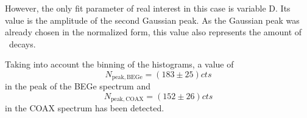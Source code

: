 \documentclass[encoding=utf8,british]{tumphthesis}
\begin{document}

However, the only fit parameter of real interest in this case is variable D.
Its value is the amplitude of the second Gaussian peak.
As the Gaussian peak was already chosen in the normalized form, this value also represents the amount of \Kr\ decays.

Taking into account the binning of the histograms, a value of  
\begin{equation*}
N_{\mathrm{peak,BEGe}} = (183\pm25) \unit{cts}
\end{equation*} in the peak of the BEGe spectrum and
\begin{equation*}
N_{\mathrm{peak,COAX}} = (152\pm26) \unit{cts}
\end{equation*}in the COAX spectrum has been detected.
\\
\end{document}
